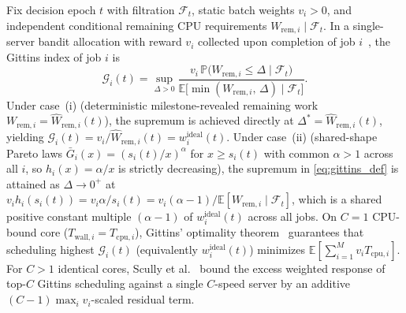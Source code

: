 \documentclass[10pt,journal,compsoc]{IEEEtran}
\theoremstyle{definition}
\theoremstyle{remark}
\newcommand{\E}{\mathbb{E}}
\newcommand{\Prob}{\mathbb{P}}
\begin{document}
\begin{IEEEproof}
Fix decision epoch $t$ with filtration $\mathcal{F}_t$, static batch weights $v_i > 0$, and independent conditional remaining CPU requirements $W_{\mathrm{rem},i} \mid \mathcal{F}_t$. In a single-server bandit allocation with reward $v_i$ collected upon completion of job $i$~\cite{gittins1979bandit,aalto2009gittins}, the Gittins index of job $i$ is
\begin{equation}\label{eq:gittins_def}
\mathcal{G}_i(t) = \sup_{\Delta > 0} \frac{v_i\,\Prob\bigl(W_{\mathrm{rem},i} \le \Delta \mid \mathcal{F}_t\bigr)}{\E\bigl[\min(W_{\mathrm{rem},i},\, \Delta) \mid \mathcal{F}_t\bigr]}.
\end{equation}
Under case~(i) (deterministic milestone-revealed remaining work $W_{\mathrm{rem},i} = \hat{W}_{\mathrm{rem},i}(t)$), the supremum is achieved directly at $\Delta^* = \hat{W}_{\mathrm{rem},i}(t)$, yielding $\mathcal{G}_i(t) = v_i / \hat{W}_{\mathrm{rem},i}(t) = w_i^{\mathrm{ideal}}(t)$. Under case~(ii) (shared-shape Pareto laws $\bar{G}_i(x) = (s_i(t)/x)^\alpha$ for $x \ge s_i(t)$ with common $\alpha > 1$ across all $i$, so $h_i(x) = \alpha/x$ is strictly decreasing), the supremum in \eqref{eq:gittins_def} is attained as $\Delta \to 0^+$ at $v_i h_i(s_i(t)) = v_i \alpha / s_i(t) = v_i (\alpha - 1) / \E[W_{\mathrm{rem},i} \mid \mathcal{F}_t]$, which is a shared positive constant multiple $(\alpha - 1)$ of $w_i^{\mathrm{ideal}}(t)$ across all jobs. On $C = 1$ CPU-bound core ($T_{\mathrm{wall},i} = T_{\mathrm{cpu},i}$), Gittins' optimality theorem~\cite{gittins1979bandit,aalto2009gittins} guarantees that scheduling highest $\mathcal{G}_i(t)$ (equivalently $w_i^{\mathrm{ideal}}(t)$) minimizes $\E[\sum_{i=1}^M v_i T_{\mathrm{cpu},i}]$. For $C > 1$ identical cores, Scully et al.~\cite{scully2020gittins} bound the excess weighted response of top-$C$ Gittins scheduling against a single $C$-speed server by an additive $(C - 1)\max_i v_i$-scaled residual term.
\end{IEEEproof}
\end{document}
